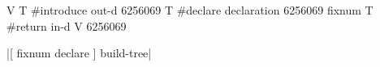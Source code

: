 \centering

  \begin{factorcode}
    V{
        T{ #introduce { out-d { 6256069 } } }
        T{ #declare { declaration { { 6256069 fixnum } } } }
        T{ #return { in-d V{ 6256069 } } }
    }
  \end{factorcode}

\caption{\factor|[ { fixnum } declare ] build-tree|}
